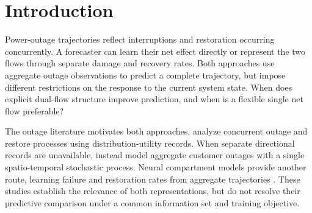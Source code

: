 \raggedbottom
{}
\fancyfoot[C]{\small\thepage}
\begin{abstract}
Single-flow and dual-flow models encode different assumptions about outage trajectories, but when either structure is preferable remains unclear. We compare a flexible net-flow predictor with an explicit damage--recovery model under shared information and full-path supervision. Our analysis balances predictable response excluded by the dual-flow restriction against the cost of learning that response. An exact local criterion incorporates temporal covariance, and a regular nonlinear expansion extends the comparison to smooth neural path estimators. A solvable stochastic model isolates response variability while holding the external input, initial state, and conditional mean fixed; numerical experiments recover the predicted changes in model preference. Across 26 US storm panels with matched ERA5 inputs, neural comparative advantage varies systematically with response characteristics. A theory-motivated diagnostic has rank correlation $0.78$ with the observed risk difference, and post-hoc response-level selection lowers recorded risk by $3.21\%$ relative to the better fixed model. These results support conditional response statistics as a basis for choosing trajectory-model structure.
\end{abstract}

\section{Introduction}
Power-outage trajectories reflect interruptions and restoration occurring concurrently. A forecaster can learn their net effect directly or represent the two flows through separate damage and recovery rates. Both approaches use aggregate outage observations to predict a complete trajectory, but impose different restrictions on the response to the current system state. When does explicit dual-flow structure improve prediction, and when is a flexible single net flow preferable?

The outage literature motivates both approaches. \citet{carrington2021} analyze concurrent outage and restore processes using distribution-utility records. When separate directional records are unavailable, \citet{zhu2025} instead model aggregate customer outages with a single spatio-temporal stochastic process. Neural compartment models provide another route, learning failure and restoration rates from aggregate trajectories \citep{chen2025}. These studies establish the relevance of both representations, but do not resolve their predictive comparison under a common information set and training objective.

